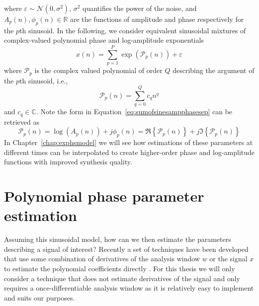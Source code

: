 where $\varepsilon \sim \mathcal{N}(0,\sigma^{2})$, $\sigma^{2}$ quantifies the
power of the noise, and $A_{p}(n),\phi_{p}(n) \in \mathbb{R}$ are the functions of
amplitude and phase respectively for the $p$th sinusoid. In the following, we
consider equivalent sinusoidal mixtures of complex-valued polynomial phase and
log-amplitude exponentials
\[
    x(n)=\sum_{p=1}^{P} \exp(\mathcal{P}_p(n)) + \varepsilon
\]
where $\mathcal{P}_p$ is the complex valued polynomial of order $Q$ describing
the argument of the $p$th sinusoid, i.e.,
\[
    \mathcal{P}_p(n) = \sum_{q=0}^{Q} c_q n^{q}
\]
and $c_q \in \mathbb{C}$. Note the form in
Equation~\ref{eq:sumofsinesampphasesep} can be retrieved as
\[
    \mathcal{P}_p(n) = \log(A_p(n)) +  j \phi_p(n) =
    \Re\left\{\mathcal{P}_p(n)\right\} +
    j\Im\left\{\mathcal{P}_p(n)\right\}
\]
In Chapter~\ref{chap:exphsmodel} we will see how estimations of these parameters
at different times can be interpolated to create higher-order phase and
log-amplitude functions
with improved synthesis quality.

\section{Polynomial phase parameter estimation}
\label{sec:ddm_description}
Assuming this sinusoidal model, how can we then
estimate the parameters describing a signal of interest? Recently a set of
techniques have been developed that use some combination of derivatives of the
analysis window $w$ or the signal $x$ to estimate the polynomial coefficients
directly \cite{hamilton2011non}. For this thesis we will only consider a
technique that does not estimate derivatives of the signal and only requires a
once-differentiable analysis window as it is relatively easy to implement and
suits our purposes.

